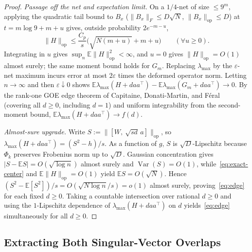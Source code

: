 \documentclass[11pt]{article}
\theoremstyle{plain}
\theoremstyle{definition}
\theoremstyle{remark}
\DeclareMathOperator{\Var}{Var}
\begin{document}
\begin{proof}
\emph{Passage off the net and expectation limit.} On a $1/4$-net of size $\le 9^m$, applying the quadratic tail bound to $B_x$ ($\|B_x\|_F \le D\sqrt{N}$, $\|B_x\|_{\mathrm{op}} \le D$) at $t = m\log 9 + m + u$ gives, outside probability $2e^{-m-u}$,
\[
\|H\|_{\mathrm{op}} \le \frac{C_p}{s}\bigl(\sqrt{N(m+u)} + m + u\bigr) \qquad (\forall u \ge 0).
\]
Integrating in $u$ gives $\sup_n \mathbb{E}\|H\|_{\mathrm{op}}^2 < \infty$, and $u = 0$ gives $\|H\|_{\mathrm{op}} = O(1)$ almost surely; the same moment bound holds for $G_m$. Replacing $\lambda_{\max}$ by the $\varepsilon$-net maximum incurs error at most $2\varepsilon$ times the deformed operator norm. Letting $n \to \infty$ and then $\varepsilon \downarrow 0$ shows $\mathbb{E}\lambda_{\max}(H + daa^\top) - \mathbb{E}\lambda_{\max}(G_m + daa^\top) \to 0$. By the rank-one GOE edge theorem of Capitaine, Donati-Martin, and F\'eral~\cite{Capitaine2009} (covering all $d \ge 0$, including $d = 1$) and uniform integrability from the second-moment bound, $\mathbb{E}\lambda_{\max}(H + daa^\top) \to f(d)$.

\emph{Almost-sure upgrade.} Write $S := \|[W,\ \sqrt{sd}\,a]\|_{\mathrm{op}}$, so $\lambda_{\max}(H + daa^\top) = (S^2 - h)/s$. As a function of $g$, $S$ is $\sqrt{D}$-Lipschitz because $\Phi_k$ preserves Frobenius norm up to $\sqrt{D}$. Gaussian concentration gives $|S - \mathbb{E} S| = O(\sqrt{\log n})$ almost surely and $\Var(S) = O(1)$, while~\eqref{eq:exact-center} and $\mathbb{E}\|H\|_{\mathrm{op}} = O(1)$ yield $\mathbb{E} S = O(\sqrt{N})$. Hence $(S^2 - \mathbb{E}[S^2])/s = O(\sqrt{N\log n}/s) = o(1)$ almost surely, proving~\eqref{eq:edge} for each fixed $d \ge 0$. Taking a countable intersection over rational $d \ge 0$ and using the $1$-Lipschitz dependence of $\lambda_{\max}(H + daa^\top)$ on $d$ yields~\eqref{eq:edge} simultaneously for all $d \ge 0$.
\end{proof}

\subsection{Extracting Both Singular-Vector Overlaps}
\end{document}
